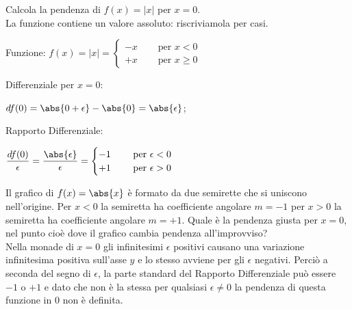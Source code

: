 \begin{esempio}
\label{esempio:diff01_derimodulo}
 Calcola la pendenza di \(f(x)=|x|\) per \(x=0\).\\
 La funzione contiene un valore assoluto: riscriviamola per casi.\\
 
 \begin{minipage}[]{.39 \textwidth}
 \begin{center}
\begin{inaccessibleblock}
  \derivamodulouno
\end{inaccessibleblock}
\end{center}
 \end{minipage} 
 \hfill
 \begin{minipage}[]{.59 \textwidth}
Funzione: 
\(f(x)=|x|=\begin{cases}
  -x\quad &\mbox{ per }x<0\\
  +x\quad &\mbox{ per }x\ge 0
\end{cases}\)

\vspace{.5em}
Differenziale per \(x=0\):

\vspace{.5em}
\(df(0) = \abs{0+\epsilon} - \abs{0} = \abs{\epsilon}\);

\vspace{.5em}
Rapporto Differenziale:

\vspace{.5em}
\(\dfrac{df(0)}{\epsilon}=\dfrac{\abs{\epsilon}}{\epsilon}=
  \begin{cases}
 -1\quad &\mbox{ per } \epsilon < 0\\
 +1\quad &\mbox{ per } \epsilon > 0
 \end{cases}\)
\end{minipage}
\label{}

Il grafico di \(f(x) = \abs{x}\) è formato da due semirette che si uniscono 
nell'origine. 
Per \(x < 0\) la semiretta ha coefficiente angolare \(m = -1\) 
per \(x > 0\) la semiretta ha coefficiente angolare \(m = +1\). 
Quale è la pendenza giusta per
\(x=0\), nel punto cioè dove il grafico cambia pendenza all'improvviso?\\
Nella monade di \(x=0\) gli infinitesimi \(\epsilon\) positivi causano una 
variazione infinitesima positiva sull'asse \(y\) e lo stesso avviene per 
gli \(\epsilon\) negativi. 
Perciò a seconda del segno di \(\epsilon\), la parte standard del Rapporto 
Differenziale può essere \(-1\) o \(+1\) e dato che non è la stessa 
per qualsiasi \(\epsilon \ne 0\) la pendenza di questa funzione in \(0\) 
non è definita.
\end{esempio}

